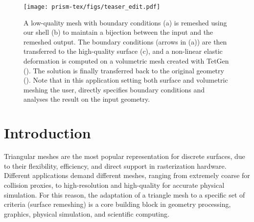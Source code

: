 
\begin{figure}
	\centering
	\texttt{[image: prism-tex/figs/teaser\_edit.pdf]}
    \caption{A low-quality mesh with boundary conditions (a)
    is remeshed using our shell (b)
    to maintain a bijection between the input and the remeshed output.
    The boundary conditions (arrows in (a)) are then transferred to the high-quality surface (c),
    and a non-linear elastic deformation is computed %
    on a volumetric mesh created with TetGen ().
    The solution is finally transferred back to the original geometry ().
    Note that in this application setting both surface and volumetric meshing  the user,  directly specifies boundary conditions and analyses the result on the input geometry.}
    
    \label{prism:fig:teaser}
\end{figure}

\section{Introduction}
\label{prism:sec:introduction}

Triangular meshes are the most popular representation for discrete surfaces, due to their flexibility, efficiency, and direct support in rasterization hardware. Different applications demand different meshes, ranging from extremely coarse for collision proxies, to high-resolution and high-quality for accurate physical simulation.
%
For this reason, the adaptation of a triangle mesh to a specific set of criteria (surface remeshing) is a core building block in geometry processing, graphics, physical simulation, and scientific computing.

